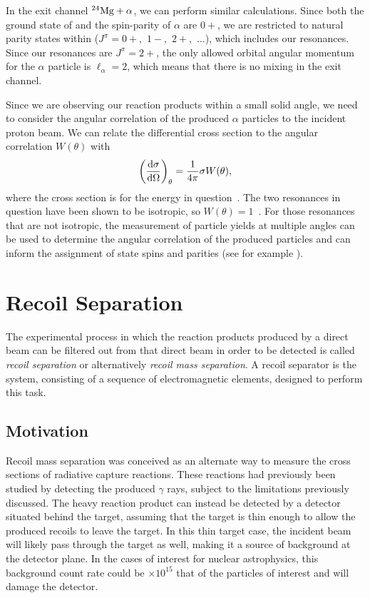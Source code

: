 In the exit channel ${}^{24}\textrm{Mg} + \alpha$, we can perform similar
calculations. Since both the ground state of  and the
spin-parity of $\alpha$ are $0+$, we are restricted to natural parity
states within  ($J^{\pi} = 0+$,~$1-$,~$2+$,~$\ldots$), which
includes our resonances. Since our resonances are $J^{\pi} = 2+$, the
only allowed orbital angular momentum for the $\alpha$ particle is
$\ell_{\alpha} = 2$, which means that there is no mixing in the exit
channel.

Since we are observing our reaction products within a small solid angle,
we need to consider the angular correlation of the produced $\alpha$
particles to the incident proton beam. We can relate the differential
cross section to the angular correlation $W(\theta)$ with
\[
    \left(\frac{\rm{d}\sigma}{\rm{d}\Omega}\right)_{\theta} =
        \frac{1}{4\pi}\sigma W(\theta),
\]
where the cross section is for the energy in question~\cite{Iliadis}.
The two resonances in question have been shown to be isotropic, so
$W(\theta) = 1$~\cite{Andersen1961}. For those resonances that are not
isotropic, the measurement of particle yields at multiple angles can be
used to determine the angular correlation of the produced particles and
can inform the assignment of state spins and parities (see for example
\cite{deBoer2015}).



\section{Recoil Separation}
\label{sec:ch01-recoil-separation}

The experimental process in which the reaction products produced by a
direct beam can be filtered out from that direct beam in order to be
detected is called \emph{recoil separation} or alternatively
\emph{recoil mass separation}. A recoil separator is the system,
consisting of a sequence of electromagnetic elements, designed to
perform this task.

\subsection{Motivation}
\label{ssec:recoil-separation-motivation}

Recoil mass separation was conceived as an alternate way to measure the
cross sections of radiative capture reactions. These reactions had
previously been studied by detecting the produced $\gamma$ rays, subject
to the limitations previously discussed. The heavy reaction product can
instead be detected by a detector situated behind the target, assuming
that the target is thin enough to allow the produced recoils to leave
the target. In this thin target case, the incident beam will likely pass
through the target as well, making it a source of background at the
detector plane. In the cases of interest for nuclear astrophysics, this
background count rate could be $\times 10^{15}$ that of the particles of
interest and will damage the detector.

